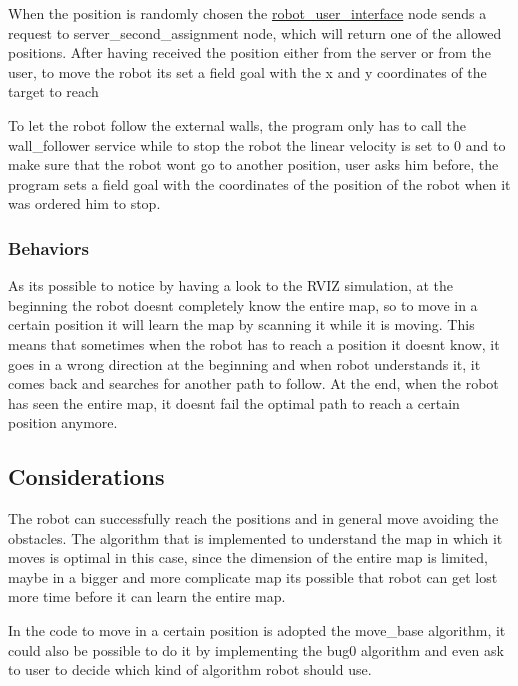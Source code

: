 When the position is randomly chosen the \hyperlink{namespacerobot__user__interface}{robot\+\_\+user\+\_\+interface} node sends a request to server\+\_\+second\+\_\+assignment node, which will return one of the allowed positions. After having received the position either from the server or from the user, to move the robot it\textquotesingle{}s set a field goal with the x and y coordinates of the target to reach

To let the robot follow the external walls, the program only has to call the wall\+\_\+follower service while to stop the robot the linear velocity is set to 0 and to make sure that the robot won\textquotesingle{}t go to another position, user asks him before, the program sets a field goal with the coordinates of the position of the robot when it was ordered him to stop.

\subsubsection*{Behaviors}

As it\textquotesingle{}s possible to notice by having a look to the R\+V\+IZ simulation, at the beginning the robot doesn\textquotesingle{}t completely know the entire map, so to move in a certain position it will learn the map by scanning it while it is moving. This means that sometimes when the robot has to reach a position it doesn\textquotesingle{}t know, it goes in a wrong direction at the beginning and when robot understands it, it comes back and searches for another path to follow. At the end, when the robot has seen the entire map, it doesn\textquotesingle{}t fail the optimal path to reach a certain position anymore.

\subsection*{Considerations}

The robot can successfully reach the positions and in general move avoiding the obstacles. The algorithm that is implemented to understand the map in which it moves is optimal in this case, since the dimension of the entire map is limited, maybe in a bigger and more complicate map it\textquotesingle{}s possible that robot can get lost more time before it can learn the entire map.

In the code to move in a certain position is adopted the move\+\_\+base algorithm, it could also be possible to do it by implementing the bug0 algorithm and even ask to user to decide which kind of algorithm robot should use.

